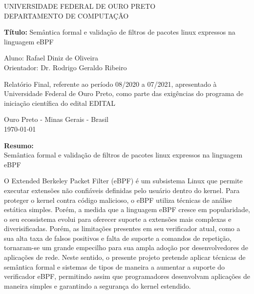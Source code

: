 \documentclass[paper=a4, fontsize=12pt]{article}
\theoremstyle{definition}
\begin{document}
\begin{center}
  UNIVERSIDADE FEDERAL DE OURO PRETO \\
  DEPARTAMENTO DE COMPUTAÇÃO\\
\end{center}
\vspace{2cm}

\begin{center}
{\bf\Large Título:} \Large{Semântica formal e validação de filtros de pacotes linux expressos na linguagem eBPF}
\end{center}
\vspace{4cm}
\begin{flushleft}
Aluno: Rafael Diniz de Oliveira\\
Orientador: Dr. Rodrigo Geraldo Ribeiro\\
\end{flushleft}
\vspace{4cm}
\noindent
Relatório Final, referente ao período 08/2020 a 07/2021, apresentado à
Universidade Federal de Ouro Preto, como parte das exigências do
programa de iniciação científica do edital EDITAL
\vspace{1cm}
\begin{center}
Ouro Preto - Minas Gerais - Brasil\\
\today
\end{center}

\clearpage

\begin{center}
{\bf\Large Resumo:}\\ \Large{Semântica formal e validação de filtros de pacotes linux expressos na linguagem eBPF}
\end{center}

\vspace{1cm}

O Extended Berkeley Packet Filter (eBPF) é um subsistema Linux que permite executar
extensões não confiáveis definidas pelo usuário dentro do kernel. Para proteger o
kernel contra código malicioso, o eBPF utiliza técnicas de análise estática simples.
Porém, a medida que a linguagem eBPF cresce em popularidade, o seu ecossistema evolui
para oferecer suporte a extensões mais complexas e diverisificadas. Porém, as limitações
presentes em seu verificador atual, como a sua alta taxa de falsos positivos e falta
de suporte a comandos de repetição, tornaram-se um grande empecilho para sua ampla
adoção por desenvolvedores de aplicações de rede. Neste sentido, o presente projeto
pretende aplicar técnicas de semântica formal e sistemas de tipos de maneira a
aumentar a suporte do verificador eBPF, permitindo assim que programadores
desenvolvam aplicações de maneira simples e garantindo a segurança do kernel
estendido.
\end{document}
